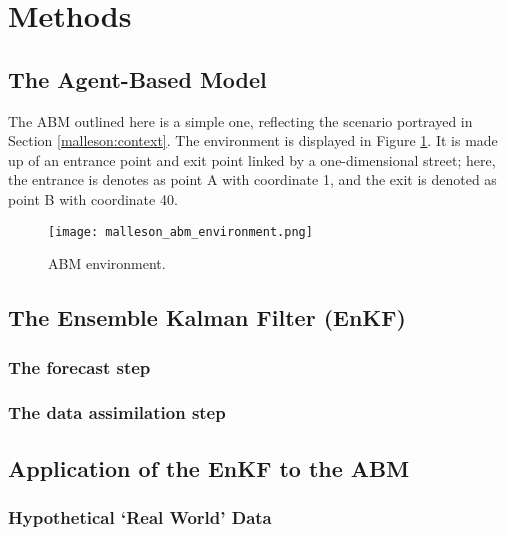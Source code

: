 \section{Methods}
\label{malleson:methods}

\subsection{The Agent-Based Model}
\label{malleson:methods:abm}

The ABM outlined here is a simple one, reflecting the scenario portrayed in Section \ref{malleson:context}.
The environment is displayed in Figure \ref{fig:malleson_abm_environment}.
It is made up of an entrance point and exit point linked by a one-dimensional street; here, the entrance is denotes as point A with coordinate 1, and the exit is denoted as point B with coordinate 40.




\begin{figure}
  \centering
    \texttt{[image: malleson\_abm\_environment.png]}
  \caption{ABM environment.}
  \label{fig:malleson_abm_environment}
\end{figure}


\subsection{The Ensemble Kalman Filter (EnKF)}
\label{malleson:methods:enkf}

\subsubsection{The forecast step}
\label{methods:enkf:forecast}

\subsubsection{The data assimilation step}
\label{methods:enkf:assimilation}

\subsection{Application of the EnKF to the ABM}
\label{malleson:methods:application}

\subsubsection{Hypothetical `Real World' Data}
\label{methods:application:data}

